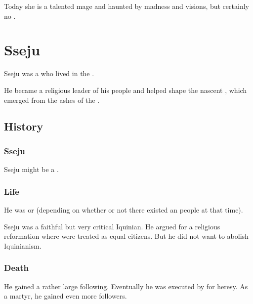 Today she is a talented mage and haunted by madness and visions, but certainly no \vertex. 















\section{Sseju}
Sseju was a \scatha{} who lived in the \VaimonCaliphate. 

He became a religious leader of his people and helped shape the nascent , which emerged from the ashes of the .









\subsection{History}





\subsubsection{Sseju}
Sseju might be a \sphyle.





\subsubsection{Life}
He was  or  (depending on whether or not there existed an \quo{\Ortaican} people at that time). 

Sseju was a faithful but very critical Iquinian.
He argued for a religious reformation where \scathae were treated as equal citizens. 
But he did not want to abolish Iquinianism.





\subsubsection{Death}
He gained a rather large following. 
Eventually he was executed by \Caliph \VizicarDurasRespina for heresy. 
As a martyr, he gained even more followers. 





